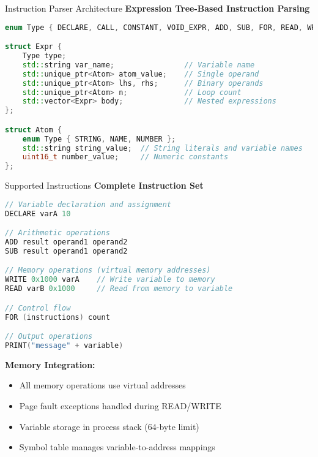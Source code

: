 \documentclass[10pt]{beamer}
\begin{document}
\begin{frame}[fragile]{Instruction Parser Architecture}
    \textbf{Expression Tree-Based Instruction Parsing}
    \begin{lstlisting}[language=C++]
enum Type { DECLARE, CALL, CONSTANT, VOID_EXPR, ADD, SUB, FOR, READ, WRITE };

struct Expr {
    Type type;
    std::string var_name;                // Variable name
    std::unique_ptr<Atom> atom_value;    // Single operand
    std::unique_ptr<Atom> lhs, rhs;      // Binary operands
    std::unique_ptr<Atom> n;             // Loop count
    std::vector<Expr> body;              // Nested expressions
};

struct Atom {
    enum Type { STRING, NAME, NUMBER };
    std::string string_value;  // String literals and variable names
    uint16_t number_value;     // Numeric constants
};
    \end{lstlisting}
\end{frame}

\begin{frame}[fragile]{Supported Instructions}
    \textbf{Complete Instruction Set}
    \begin{lstlisting}[language=C++]
// Variable declaration and assignment
DECLARE varA 10

// Arithmetic operations
ADD result operand1 operand2
SUB result operand1 operand2

// Memory operations (virtual memory addresses)
WRITE 0x1000 varA    // Write variable to memory
READ varB 0x1000     // Read from memory to variable

// Control flow
FOR (instructions) count

// Output operations
PRINT("message" + variable)
    \end{lstlisting}
    
    \vspace{0.3cm}
    \textbf{Memory Integration:}
    \begin{itemize}
        \item All memory operations use virtual addresses
        \item Page fault exceptions handled during READ/WRITE
        \item Variable storage in process stack (64-byte limit)
        \item Symbol table manages variable-to-address mappings
    \end{itemize}
\end{frame}
\end{document}
